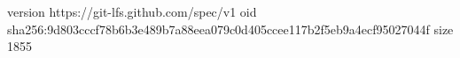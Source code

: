 version https://git-lfs.github.com/spec/v1
oid sha256:9d803cccf78b6b3e489b7a88eea079c0d405ccee117b2f5eb9a4ecf95027044f
size 1855
